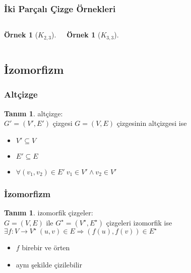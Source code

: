 \documentclass[dvipsnames]{beamer}
\theoremstyle{definition}
\newtheorem{tanim}[theorem]{Tanım}
\theoremstyle{example}
\newtheorem{ornek}[theorem]{Örnek}
\theoremstyle{plain}
\begin{document}
\begin{frame}
  \frametitle{İki Parçalı Çizge Örnekleri}

  \begin{columns}[t]
    \begin{ornek}[$K_{2,3}$]
      \begin{center}
      \end{center}
    \end{ornek}

    \begin{ornek}[$K_{3,3}$]
      \begin{center}
      \end{center}
    \end{ornek}
  \end{columns}
\end{frame}

\subsection{İzomorfizm}

\begin{frame}
  \frametitle{Altçizge}

  \begin{tanim}
    \alert{altçizge}:\\
      $G'=(V',E')$ çizgesi $G=(V,E)$ çizgesinin altçizgesi ise

    \begin{itemize}
      \item $V' \subseteq V$
      \item $E' \subseteq E$
      \item $\forall (v_1,v_2) \in E'~v_1 \in V' \wedge v_2 \in V'$
    \end{itemize}
  \end{tanim}
\end{frame}

\begin{frame}
  \frametitle{İzomorfizm}

  \begin{tanim}
    \alert{izomorfik çizgeler}:\\
    $G=(V,E)$ ile $G^\star=(V^\star,E^\star)$ çizgeleri izomorfik ise\\
    $\exists f: V \rightarrow V^\star~(u,v) \in E \Rightarrow (f(u),f(v)) \in E^\star$

    \begin{itemize}
      \item $f$ birebir ve örten
    \end{itemize}
  \end{tanim}

  \pause
  \begin{itemize}
    \item aynı şekilde çizilebilir
  \end{itemize}
\end{frame}
\end{document}
